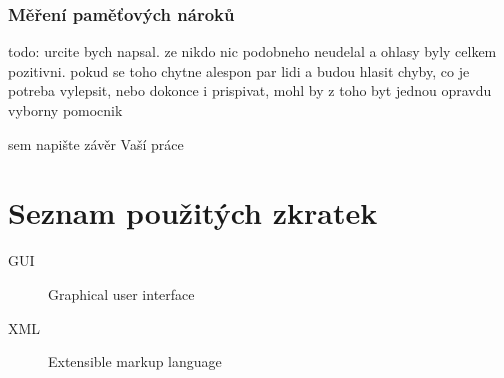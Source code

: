 \documentclass[thesis=M,czech]{FITthesis}[2012/06/26]
\begin{document}
\subsection{Měření paměťových nároků}

%
%
\begin{conclusion}

	todo: urcite bych napsal. ze nikdo nic podobneho neudelal a ohlasy byly celkem pozitivni. pokud se toho chytne alespon par lidi a budou hlasit chyby, co je potreba vylepsit, nebo dokonce i prispivat, mohl by z toho byt jednou opravdu vyborny pomocnik

	sem napište závěr Vaší práce
\end{conclusion}







\appendix

\chapter{Seznam použitých zkratek}
\begin{description}
	\item[GUI] Graphical user interface
	\item[XML] Extensible markup language
\end{description}
\end{document}

